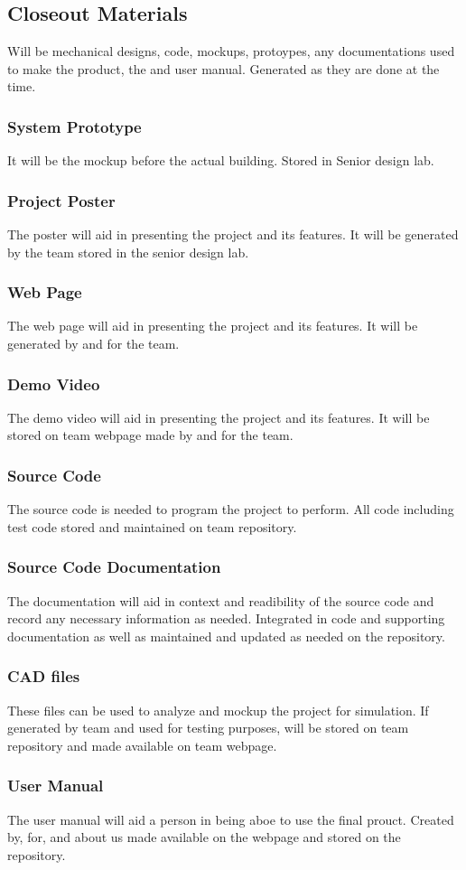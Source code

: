\subsection{Closeout Materials}
Will be mechanical designs, code, mockups, protoypes, any documentations used to make the product, the and user manual. Generated as they are done at the time. 

\subsubsection{System Prototype}
It will be the mockup before the actual building. Stored in Senior design lab.

\subsubsection{Project Poster}
The poster will aid in presenting the project and its features. It will be generated by the team stored in the senior design lab.

\subsubsection{Web Page}
The web page will aid in presenting the project and its features. It will be generated by and for the team.

\subsubsection{Demo Video}
The demo video will aid in presenting the project and its features. It will be stored on team webpage made by and for the team.

\subsubsection{Source Code}
The source code is needed to program the project to perform. All code including test code stored and maintained on team repository.

\subsubsection{Source Code Documentation}
The documentation will aid in context and readibility of the source code and record any necessary information as needed. Integrated in code and supporting documentation as well as maintained and updated as needed on the repository.

\subsubsection{CAD files}
These files can be used to analyze and mockup the project for simulation. If generated by team and used for testing purposes, will be stored on team repository and made available on team webpage.

\subsubsection{User Manual}
The user manual will aid a person in being aboe to use the final prouct. Created by, for, and about us made available on the webpage and stored on the repository.
